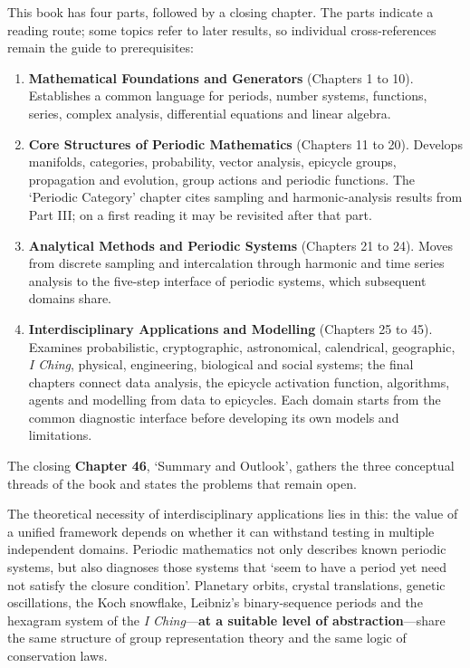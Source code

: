 This book has four parts, followed by a closing chapter. The parts indicate a reading route; some topics refer to later results, so individual cross-references remain the guide to prerequisites:
\begin{enumerate}[leftmargin=6em, label={\textbf{Part \arabic*}}]
    \item \textbf{Mathematical Foundations and Generators} (Chapters 1 to 10). Establishes a common language for periods, number systems, functions, series, complex analysis, differential equations and linear algebra.
    \item \textbf{Core Structures of Periodic Mathematics} (Chapters 11 to 20). Develops manifolds, categories, probability, vector analysis, epicycle groups, propagation and evolution, group actions and periodic functions. The `Periodic Category' chapter cites sampling and harmonic-analysis results from Part III; on a first reading it may be revisited after that part.
    \item \textbf{Analytical Methods and Periodic Systems} (Chapters 21 to 24). Moves from discrete sampling and intercalation through harmonic and time series analysis to the five-step interface of periodic systems, which subsequent domains share.
    \item \textbf{Interdisciplinary Applications and Modelling} (Chapters 25 to 45). Examines probabilistic, cryptographic, astronomical, calendrical, geographic, \emph{I Ching}, physical, engineering, biological and social systems; the final chapters connect data analysis, the epicycle activation function, algorithms, agents and modelling from data to epicycles. Each domain starts from the common diagnostic interface before developing its own models and limitations.
\end{enumerate}
The closing \textbf{Chapter 46}, `Summary and Outlook', gathers the three conceptual threads of the book and states the problems that remain open.

The theoretical necessity of interdisciplinary applications lies in this: the value of a unified framework depends on whether it can withstand testing in multiple independent domains. Periodic mathematics not only describes known periodic systems, but also diagnoses those systems that `seem to have a period yet need not satisfy the closure condition'. Planetary orbits, crystal translations, genetic oscillations, the Koch snowflake, Leibniz's binary-sequence periods and the hexagram system of the \emph{I Ching}---\textbf{at a suitable level of abstraction}---share the same structure of group representation theory and the same logic of conservation laws.

